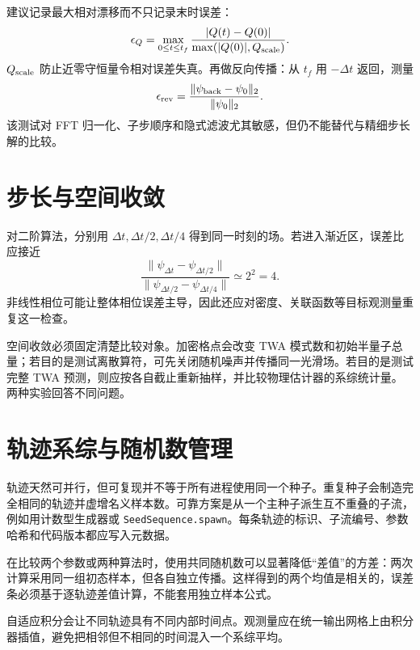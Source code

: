 建议记录最大相对漂移而不只记录末时误差：
\begin{equation}
  \epsilon_Q=\max_{0\le t\le t_f}
  \frac{|Q(t)-Q(0)|}{\max(|Q(0)|,Q_{\rm scale})}.
  \label{eq:conservation-error}
\end{equation}
$Q_{\rm scale}$ 防止近零守恒量令相对误差失真。再做反向传播：从 $t_f$ 用 $-\Delta t$ 返回，测量
\begin{equation}
  \epsilon_{\rm rev}=
  \frac{\|\psi_{\rm back}-\psi_0\|_2}{\|\psi_0\|_2}.
  \label{eq:reversibility-error}
\end{equation}
该测试对 FFT 归一化、子步顺序和隐式滤波尤其敏感，但仍不能替代与精细步长解的比较。

\section{步长与空间收敛}

对二阶算法，分别用 $\Delta t,\Delta t/2,\Delta t/4$ 得到同一时刻的场。若进入渐近区，误差比应接近
\begin{equation}
  \frac{\|\psi_{\Delta t}-\psi_{\Delta t/2}\|}
       {\|\psi_{\Delta t/2}-\psi_{\Delta t/4}\|}
  \simeq 2^2=4.
  \label{eq:second-order-ratio}
\end{equation}
非线性相位可能让整体相位误差主导，因此还应对密度、关联函数等目标观测量重复这一检查。

空间收敛必须固定清楚比较对象。加密格点会改变 TWA 模式数和初始半量子总量；若目的是测试离散算符，可先关闭随机噪声并传播同一光滑场。若目的是测试完整 TWA 预测，则应按各自截止重新抽样，并比较物理估计器的系综统计量。两种实验回答不同问题。

\section{轨迹系综与随机数管理}

轨迹天然可并行，但可复现并不等于所有进程使用同一个种子。重复种子会制造完全相同的轨迹并虚增名义样本数。可靠方案是从一个主种子派生互不重叠的子流，例如用计数型生成器或 \texttt{SeedSequence.spawn}。每条轨迹的标识、子流编号、参数哈希和代码版本都应写入元数据。

在比较两个参数或两种算法时，使用共同随机数可以显著降低“差值”的方差：两次计算采用同一组初态样本，但各自独立传播。这样得到的两个均值是相关的，误差条必须基于逐轨迹差值计算，不能套用独立样本公式。

自适应积分会让不同轨迹具有不同内部时间点。观测量应在统一输出网格上由积分器插值，避免把相邻但不相同的时间混入一个系综平均。

